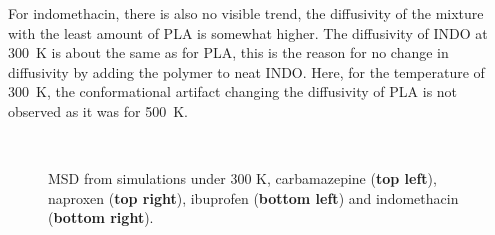 For indomethacin, there is also no visible trend, the diffusivity of the mixture with the least amount of PLA is somewhat higher. The diffusivity of INDO at 300~K is about the same as for PLA, this is the reason for no change in diffusivity by adding the polymer to neat INDO. Here, for the temperature of 300~K, the conformational artifact changing the diffusivity of PLA is not observed as it was for 500~K. 


\begin{figure}[H]
	\centering
	\\
	\caption{MSD from simulations under 300 K, carbamazepine (\textbf{top left}), naproxen (\textbf{top right}), ibuprofen (\textbf{bottom left}) and indomethacin (\textbf{bottom right}).}
	\label{fig:msd_r1}    
\end{figure}

